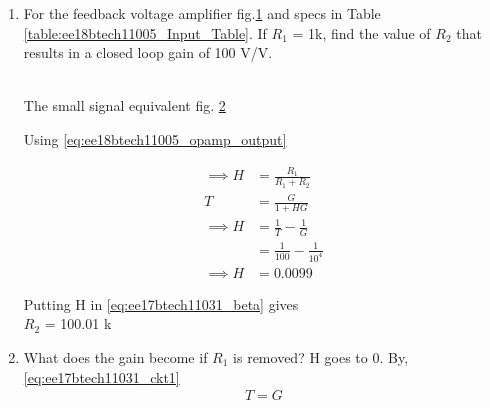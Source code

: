 \begin{enumerate}[label=\thesection.\arabic*.,ref=\thesection.\theenumi]
\item For the feedback voltage amplifier fig.\ref{fig:Original ckt} and specs in Table \ref{table:ee18btech11005_Input_Table}. If $R_{1}$ = 1k\ohm , find the value of $R_{2}$ that results in a closed loop gain of 100 V/V.

\begin{figure}[!ht]
	\begin{center}
			\resizebox{\columnwidth}{!}{}
	\end{center}
\caption{}
\label{fig:Original ckt}
\end{figure}

\begin{table}[!ht]
\centering

\caption{}
\label{table:ee18btech11005_Input_Table}
\end{table}

\\
\solution The small signal equivalent fig. \ref{fig:small ckt}
\begin{figure}[!ht]
	\begin{center}
			\resizebox{\columnwidth}{!}{}
	\end{center}
\caption{}
\label{fig:small ckt}
\end{figure}

Using \ref{eq:ee18btech11005_opamp_output}

\begin{align}
 \implies H &= \frac{R_{1}}{R_{1}+R_{2}}
\label{eq:ee17btech11031_beta}\\
T &= \frac{G}{1+ HG}\\
\implies H &= \frac{1}{T} - \frac{1}{G}
\label{eq:ee17btech11031_ckt1}\\
&= \frac{1}{100} - \frac{1}{10^4}\\
\implies H &= 0.0099
\end{align}

Putting H in \eqref{eq:ee17btech11031_beta} gives\\
\implies $R_2$ = 100.01 k\ohm

\item What does the gain become if $R_1$ is removed?
\solution H goes to 0. By, \ref{eq:ee17btech11031_ckt1}
\begin{align}
    T = G
\end{align}
\end{enumerate}
